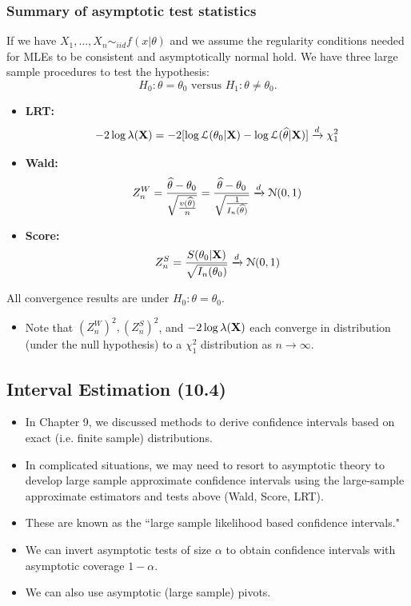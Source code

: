 \documentclass[11pt,]{article}
\newcommand{\Xndots}{X_1, \ldots, X_n}
\def\bX{{\bf X}}
\def\thetahat{{\widehat\theta}}
\def\Lsc{{\cal L}}
\def\Nsc{{\cal N}}
\begin{document}
\newpage

\subsubsection{Summary of asymptotic test statistics}

If we have \(\Xndots \sim_{iid} f(x|\theta)\) and we assume the
regularity conditions needed for MLEs to be consistent and
asymptotically normal hold. We have three large sample procedures to
test the hypothesis:
\[H_0: \theta = \theta_0 \mbox{ versus } H_1: \theta \neq \theta_0.\]

\begin{itemize}
\item \textbf{LRT:}
$$-2 \log \lambda(\bX) = -2 [\log \Lsc(\theta_0 |\bX) - \log \Lsc(\thetahat|\bX)] \xrightarrow{d} \chi^2_1$$
\item \textbf{Wald:}
$$Z_n^W = \frac{\thetahat-\theta_0}{\sqrt{\frac{v(\thetahat)}{n}}} = \frac{\thetahat-\theta_0}{\sqrt{\frac{1}{I_n(\thetahat)}}} \xrightarrow{d} \Nsc(0,1)$$
\item \textbf{Score:}
$$Z_n^S = \frac{S(\theta_0|\bX)}{\sqrt{I_n(\theta_0)}} \xrightarrow{d} \Nsc(0,1)$$
\end{itemize}

All convergence results are under \(H_0: \theta = \theta_0\).

\begin{itemize}
\item Note that $(Z_n^W)^2, (Z_n^S)^2$, and $ -2 \log \lambda(\bX)$ each converge in distribution (under the null hypothesis) to a $\chi_1^2$ distribution as $n\to\infty$.
\end{itemize}

\subsection{Interval Estimation (10.4)}

\begin{itemize}
\item In Chapter 9, we discussed methods to derive confidence intervals based on exact (i.e. finite sample) distributions.
\item In complicated situations, we may need to resort to asymptotic theory to develop large sample approximate confidence intervals using the large-sample approximate estimators and tests above (Wald, Score, LRT).
\item These are known as the ``large sample likelihood based confidence intervals."
\item We can invert asymptotic tests of size $\alpha$ to obtain confidence intervals with asymptotic coverage $1-\alpha$.
\item We can also use asymptotic (large sample) pivots.
\end{itemize}
\end{document}
